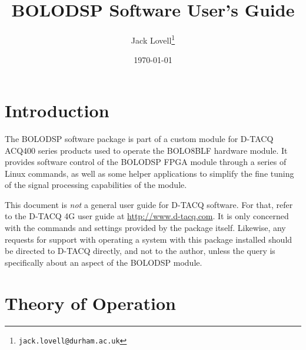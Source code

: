 \documentclass[12pt,a4paper]{article}
\begin{document}
\title{BOLODSP Software User's Guide}

\author{Jack Lovell\thanks{\texttt{jack.lovell@durham.ac.uk}}}

\date{\today}

\maketitle


\tableofcontents

\section{Introduction}
The BOLODSP software package is part of a custom module for D-TACQ ACQ400 series products used to operate the BOLO8BLF hardware module. It provides
software control of the BOLODSP FPGA module through a series of Linux commands, as well as some helper applications to simplify the fine tuning of the
signal processing capabilities of the module.

This document is \textit{not} a general user guide for D-TACQ software. For that, refer to the D-TACQ 4G user guide at \mbox{\url{http://www.d-tacq.com}}.
It is only concerned with the commands and settings provided by the package itself. Likewise, any requests for support with operating a system with this
package installed should be directed to D-TACQ directly, and not to the author, unless the query is specifically about an aspect of the BOLODSP module.

\section{Theory of Operation}
\end{document}
